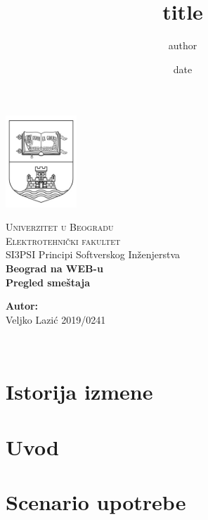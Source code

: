 \documentclass[12pt]{report}
\begin{document}
\title{title}
\author{author}
\date{date}

\begin{titlepage}
\begin{center}
    \includegraphics[width=0.2\textwidth]{logo.jpg}
\end{center}
\begin{center}
    \textsc{ \LARGE{Univerzitet u Beogradu \\}}
	\textsc{ \LARGE{Elektrotehnički fakultet\\ }}
	\textnormal{ \LARGE{SI3PSI Principi Softverskog Inženjerstva\\}}
	\vspace{30mm}
	\fontsize{10mm}{7mm}\selectfont 
    \textbf{\textup{Beograd na WEB-u}}\\
    \textbf{Pregled smeštaja}\\
\end{center}

\vspace{25mm}

\begin{minipage}[t]{0.47\textwidth}
	\textnormal{\large{\bf Autor:\\}}
	{\large Veljko Lazić 2019/0241}\\
\end{minipage}

\vspace{20mm}

\\

\end{titlepage}


\chapter{\color{RoyalBlue}Istorija izmene}

\chapter{\color{RoyalBlue}Uvod}

\chapter{\color{RoyalBlue}Scenario upotrebe}

\end{document}
